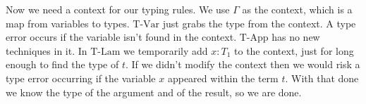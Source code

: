 \begin{frame}
\begin{mdframed}[frametitle={Typing rules}]
\begin{overprint}
\end{overprint}
\end{mdframed}
\medskip
\begin{overprint}
 Now we need a context for our typing rules.
 We use $\Gamma$ as the context, which is a map from variables to types.
 $\text{T-Var}$ just grabs the type from the context.
 A type error occurs if the variable isn't found in the context.
 $\text{T-App}$ has no new techniques in it.
 In $\text{T-Lam}$ we temporarily add $x {:} T_1$ to the context, just for long enough to find the type of $t$.
 If we didn't modify the context then we would risk a type error occurring if the variable $x$ appeared within the term $t$.
 With that done we know the type of the argument and of the result, so we are done.
\end{overprint}
\end{frame}


